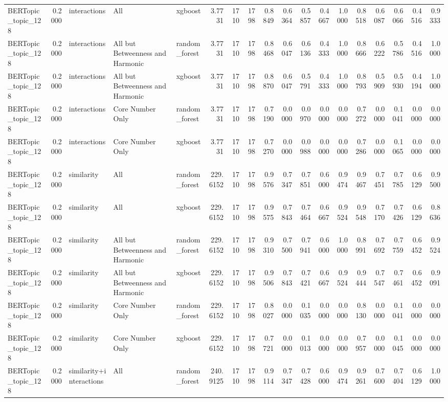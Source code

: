 \begin{tabular}{lrlllrrrrrrrrrrrrr}
BERTopic_topic_128 & 0.2000 & interactions & All & xgboost & 3.7731 & 1710 & 1798 & 0.8849 & 0.6364 & 0.5857 & 0.4667 & 1.0000 & 0.8518 & 0.6087 & 0.6066 & 0.4516 & 0.9333 \\
BERTopic_topic_128 & 0.2000 & interactions & All but Betweenness and Harmonic & random_forest & 3.7731 & 1710 & 1798 & 0.8468 & 0.6047 & 0.6136 & 0.4333 & 1.0000 & 0.8666 & 0.6222 & 0.5786 & 0.4516 & 1.0000 \\
BERTopic_topic_128 & 0.2000 & interactions & All but Betweenness and Harmonic & xgboost & 3.7731 & 1710 & 1798 & 0.8870 & 0.6047 & 0.5791 & 0.4333 & 1.0000 & 0.8793 & 0.5909 & 0.5930 & 0.4194 & 1.0000 \\
BERTopic_topic_128 & 0.2000 & interactions & Core Number Only & random_forest & 3.7731 & 1710 & 1798 & 0.7190 & 0.0000 & 0.0970 & 0.0000 & 0.0000 & 0.7272 & 0.0000 & 0.1041 & 0.0000 & 0.0000 \\
BERTopic_topic_128 & 0.2000 & interactions & Core Number Only & xgboost & 3.7731 & 1710 & 1798 & 0.7270 & 0.0000 & 0.0988 & 0.0000 & 0.0000 & 0.7286 & 0.0000 & 0.1065 & 0.0000 & 0.0000 \\
BERTopic_topic_128 & 0.2000 & similarity & All & random_forest & 229.6152 & 1710 & 1798 & 0.9576 & 0.7347 & 0.7851 & 0.6000 & 0.9474 & 0.9467 & 0.7451 & 0.7785 & 0.6129 & 0.9500 \\
BERTopic_topic_128 & 0.2000 & similarity & All & xgboost & 229.6152 & 1710 & 1798 & 0.9575 & 0.7843 & 0.7464 & 0.6667 & 0.9524 & 0.9548 & 0.7170 & 0.7426 & 0.6129 & 0.8636 \\
BERTopic_topic_128 & 0.2000 & similarity & All but Betweenness and Harmonic & random_forest & 229.6152 & 1710 & 1798 & 0.9310 & 0.7500 & 0.7941 & 0.6000 & 1.0000 & 0.8991 & 0.7692 & 0.7759 & 0.6452 & 0.9524 \\
BERTopic_topic_128 & 0.2000 & similarity & All but Betweenness and Harmonic & xgboost & 229.6152 & 1710 & 1798 & 0.9506 & 0.7843 & 0.7421 & 0.6667 & 0.9524 & 0.9444 & 0.7547 & 0.7461 & 0.6452 & 0.9091 \\
BERTopic_topic_128 & 0.2000 & similarity & Core Number Only & random_forest & 229.6152 & 1710 & 1798 & 0.8027 & 0.0000 & 0.1035 & 0.0000 & 0.0000 & 0.8130 & 0.0000 & 0.1041 & 0.0000 & 0.0000 \\
BERTopic_topic_128 & 0.2000 & similarity & Core Number Only & xgboost & 229.6152 & 1710 & 1798 & 0.7721 & 0.0000 & 0.1013 & 0.0000 & 0.0000 & 0.7957 & 0.0000 & 0.1045 & 0.0000 & 0.0000 \\
BERTopic_topic_128 & 0.2000 & similarity+interactions & All & random_forest & 240.9125 & 1710 & 1798 & 0.9114 & 0.7347 & 0.7428 & 0.6000 & 0.9474 & 0.9261 & 0.7600 & 0.7404 & 0.6129 & 1.0000 \\

\end{tabular}
